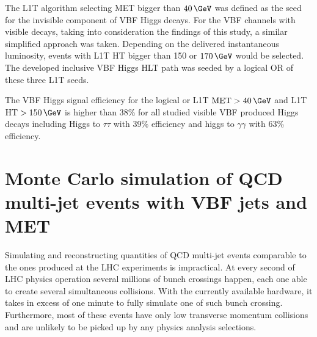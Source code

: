 The \gls{L1T} algorithm selecting \gls{MET} bigger than $40\,\GeV$ was defined as the seed for the invisible component of \gls{VBF} Higgs decays. For the \gls{VBF} channels with visible decays, taking into consideration the findings of this study, a similar simplified approach was taken. Depending on the delivered instantaneous luminosity, events with \gls{L1T} \gls{HT} bigger than 150 or $170\,\GeV$ would be selected. The developed inclusive \gls{VBF} Higgs \gls{HLT} path was seeded by a logical OR of these three \gls{L1T} seeds.

The \gls{VBF} Higgs signal efficiency for the logical or \gls{L1T} $\text{MET}>40\,\GeV$ and \gls{L1T} $\text{HT}>150\,\GeV$ is higher than 38\% for all studied visible \gls{VBF} produced Higgs decays including Higgs to $\tau\tau$ with 39\% efficiency and higgs to $\gamma\gamma$ with 63\% efficiency. 

\section{Monte Carlo simulation of QCD multi-jet events with VBF jets and MET}
\label{SECTION:PreparationParkedDataAnalysis_QCDVBFMET}

% 
% 


Simulating and reconstructing quantities of \gls{QCD} multi-jet events comparable to the ones produced at the \gls{LHC} experiments is impractical. At every second of \gls{LHC} physics operation several millions of bunch crossings happen, each one able to create several simultaneous collisions. With the currently available hardware, it takes in excess of one minute to fully simulate one of such bunch crossing. Furthermore, most of these events have only low transverse momentum collisions and are unlikely to be picked up by any physics analysis selections.

